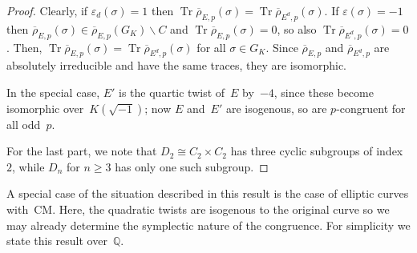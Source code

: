 \documentclass[12pt, reqno]{amsart}
\newcommand{\Q}{\mathbb{Q}}
\newcommand{\rhobar}{{\overline{\rho}}}
\newcommand{\eps}{\varepsilon}
\DeclareMathOperator{\Tr}{Tr}
\numberwithin{equation}{section}
\theoremstyle{definition}
\theoremstyle{remark}
\begin{document}
\begin{proof}
Clearly, if $\eps_d(\sigma)=1$ then $\Tr \rhobar_{E,p}(\sigma) = \Tr \rhobar_{E^d,p}(\sigma)$. 
If $\eps(\sigma) = -1$ then $\rhobar_{E,p}(\sigma) \in \rhobar_{E,p} (G_K) \backslash C$ and $\Tr \rhobar_{E,p}(\sigma) = 0$, so also $\Tr \rhobar_{E^d,p}(\sigma) = 0$.
Then, $\Tr \rhobar_{E,p}(\sigma) = \Tr \rhobar_{E^d,p}(\sigma)$ 
for all $\sigma \in G_K$. 
Since $\rhobar_{E,p}$ and $\rhobar_{E^d,p}$ are absolutely irreducible
and have the same traces, they are isomorphic.

In the special case, $E'$ is the quartic twist of~$E$ by~$-4$, since
these become isomorphic over~$K(\sqrt{-1})$; now $E$ and~$E'$ are
isogenous, so are $p$-congruent for all odd~$p$.

For the last part, we note that $D_2\cong C_2\times C_2$ has three
cyclic subgroups of index~$2$, while $D_n$ for $n\ge3$ has only one
such subgroup.
\end{proof}


A special case of the situation described in this result is the case
of elliptic curves with~CM.  Here, the quadratic twists are isogenous
to the original curve so we may already determine the symplectic nature
of the congruence.  For simplicity we state this result over~$\Q$.
\end{document}

